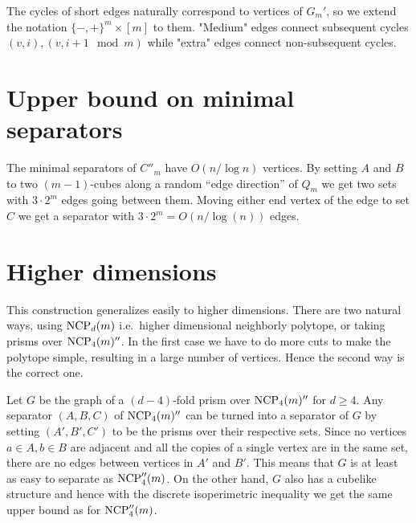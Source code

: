 The cycles of short edges naturally correspond to vertices of $G_m'$, so we extend the notation $\{-,+\}^m \times [m]$ to them. "Medium" edges connect subsequent cycles $(v,i), (v,i+1 \mod m)$ while "extra" edges connect non-subsequent cycles. 


\section{Upper bound on minimal separators}

The minimal separators of $C''_m$ have $O(n/\log n)$ vertices. By setting $A$ 
and $B$ to two $(m-1)$-cubes along a random ``edge direction'' of $Q_m$ we get 
two sets with $3\cdot 2^m$ edges going between them. Moving either end vertex 
of the edge to set $C$ we get a separator with $3\cdot 2^m = O(n/\log(n))$ 
edges.

\section{Higher dimensions}

This construction generalizes easily to higher dimensions. There are two 
natural ways, using $\textrm{NCP}_d(m)$ i.e.\ higher dimensional neighborly polytope, or 
taking prisms over $\textrm{NCP}_4(m)''$.  In the first case we have to do more cuts to 
make the polytope simple, resulting in a large number of vertices. Hence the 
second way is the correct one. 

Let $G$ be the graph of a $(d-4)$-fold prism over $\textrm{NCP}_4(m)''$ for $d\geq 4$. 
Any separator 
$(A,B,C)$ of $\textrm{NCP}_4(m)''$ can be turned into a separator of $G$ by setting 
$(A',B',C')$ to be the prisms over their respective sets. Since no vertices 
$a\in A, b\in B$ are adjacent and all the copies of a single vertex are in the 
same set, there are no edges between vertices in $A'$ and $B'$. This means that 
$G$ is at least as easy to separate as $\textrm{NCP}''_4(m)$. On the other hand, $G$ 
also has a cubelike structure and hence with the discrete isoperimetric 
inequality we get the same upper bound as for $\textrm{NCP}''_4(m)$. 




